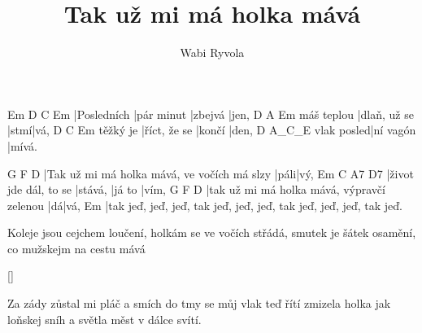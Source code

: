 \documentclass{song}
\author{Wabi Ryvola}
\title{Tak už mi má holka mává}
\begin{document}
\strophe
Em          D          C       Em
|Posledních |pár minut |zbejvá |jen,
           D            A    Em
máš teplou |dlaň, už se |stmí|vá,
         D            C      Em
těžký je |říct, že se |končí |den,
           D         A_C_E
vlak posled|ní vagón |mívá.
\endstrophe

G                                           F    D
|Tak už mi má holka mává, ve vočích má slzy |páli|vý,
Em                    C       A7     D7
|život jde dál, to se |stává, |já to |vím,
G                                          F  D
|tak už mi má holka mává, výpravčí zelenou |dá|vá,
Em
|tak jeď, jeď, jeď, tak jeď, jeď, jeď, tak jeď, jeď, jeď, tak jeď.
\endstrophe

\strophe*
Koleje jsou cejchem loučení,
holkám se ve vočích střádá,
smutek je šátek osamění,
co mužskejm na cestu mává
\endstrophe

\ref{}

\strophe*
Za zády zůstal mi pláč a smích
do tmy se můj vlak teď řítí
zmizela holka jak loňskej sníh
a světla měst v dálce svítí.
\endstrophe
\end{document}
